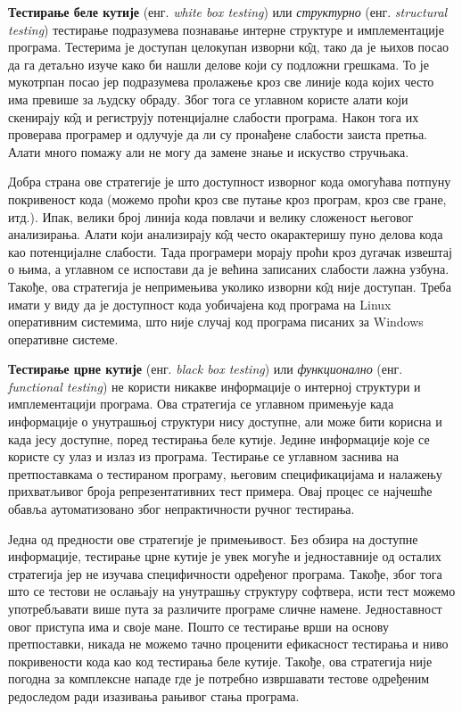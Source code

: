 \documentclass[12pt,oneside]{memoir}
\begin{document}
\begin{description}
\item \textbf{Тестирање беле кутије} (енг. \textit{white box testing}) или \textit{структурно} (енг. \textit{structural testing}) тестирање подразумева познавање интерне структуре и имплементације програма. Тестерима је доступан целокупан изворни к\^{о}д, тако да је њихов посао да га детаљно изуче како би нашли делове који су подложни грешкама. То је мукотрпан посао јер подразумева пролажење кроз све линије кода којих често има превише за људску обраду. Због тога се углавном користе алати који скенирају к\^{о}д и региструју потенцијалне слабости програма. Након тога их проверава програмер и одлучује да ли су пронађене слабости заиста претња. Алати много помажу али не могу да замене знање и искуство стручњака. 
\par Добра страна ове стратегије је што доступност изворног кода омогућава потпуну покривеност кода (можемо проћи кроз све путање кроз програм, кроз све гране, итд.). Ипак, велики број линија кода повлачи и велику сложеност његовог анализирања. Алати који анализирају к\^{о}д често окарактеришу пуно делова кода као потенцијалне слабости. Тада програмери морају проћи кроз дугачак извештај о њима, а углавном се испостави да је већина записаних слабости лажна узбуна. Такође, ова стратегија је непримењива уколико изворни к\^{о}д није доступан. Треба имати у виду да је доступност кода уобичајена код програма на Linux оперативним системима, што није случај код програма писаних за Windows оперативне системе. 

\item \textbf{Тестирање црне кутије} (енг. \textit{black box testing}) или \textit{функционално} (енг. \textit{functional testing}) не користи никакве информације о интерној структури и имплементацији програма. Ова стратегија се углавном примењује када информације о унутрашњој структури нису доступне, али може бити корисна и када јесу доступне, поред тестирања беле кутије. Једине информације које се користе су улаз и излаз из програма. Тестирање се углавном заснива на претпоставкама о тестираном програму, његовим спецификацијама и налажењу прихватљивог броја репрезентативних тест примера. Овај процес се најчешће обавља аутоматизовано због непрактичности ручног тестирања.
\par Једна од предности ове стратегије је примењивост. Без обзира на доступне информације, тестирање црне кутије је увек могуће и једноставније од осталих стратегија јер не изучава специфичности одређеног програма. Такође, због тога што се тестови не ослањају на унутрашњу структуру софтвера, исти тест можемо употребљавати више пута за различите програме сличне намене. Једноставност овог приступа има и своје мане. Пошто се тестирање врши на основу претпоставки, никада не можемо тачно проценити ефикасност тестирања и ниво покривености кода као код тестирања беле кутије. Такође, ова стратегија није погодна за комплексне нападе где је потребно извршавати тестове одређеним редоследом ради изазивања рањивог стања програма.


\end{description}
\end{document}
